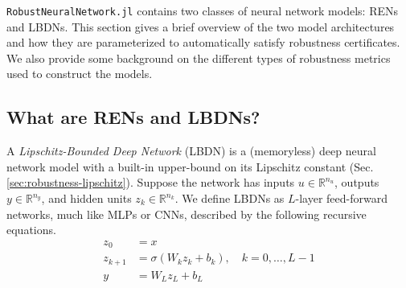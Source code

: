 \verb|RobustNeuralNetwork.jl| contains two classes of neural network models: RENs and LBDNs. This section gives a brief overview of the two model architectures and how they are parameterized to automatically satisfy robustness certificates. We also provide some background on the different types of robustness metrics used to construct the models.

\subsection{What are RENs and LBDNs?} \label{sec:model-structures}

A \textit{Lipschitz-Bounded Deep Network} (LBDN) is a (memoryless) deep neural network model with a built-in upper-bound on its Lipschitz constant (Sec. \ref{sec:robustness-lipschitz}). Suppose the network has inputs $u \in\mathbb{R}^{n_u}$, outputs $y \in \mathbb{R}^{n_y}$, and hidden units $z_k \in \mathbb{R}^{n_k}$. We define LBDNs as $L$-layer feed-forward networks, much like MLPs or CNNs, described by the following recursive equations.
\begin{align} 
z_0 &= x \label{eqn:lbdn-z0}\\
z_{k+1} &= \sigma(W_k z_k + b_k), \quad k = 0, \ldots, L-1 \label{eqn:lbdn-sandwich}\\
y &= W_L z_L + b_L \label{eqn:lbdn-output}
\end{align}

